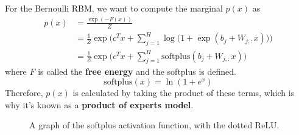     \begin{lemma} 
      For the Bernoulli RBM, we want to compute the marginal $p(x)$ as
      \begin{align*} 
      p(x) & = \frac{\exp(-F(x))}{Z} \\
                    & = \frac{1}{Z} \exp \bigg( c^T x + \sum_{j=1}^H \log \big( 1 + \exp (b_j + W_{j, :} x) \big) \bigg) \\
                    & = \frac{1}{Z} \exp \bigg( c^T x + \sum_{j=1}^H \mathrm{softplus}(b_j + W_{j, :} x ) \bigg)
      \end{align*}
      where $F$ is called the \textbf{free energy} and the softplus is defined. 
      \begin{equation}
        \text{softplus}(x) = \ln(1 + e^x)
      \end{equation}
      Therefore, $p(x)$ is calculated by taking the product of these terms, which is why it's known as a \textbf{product of experts model}. 

      \begin{figure}[H]
        \centering 
        \caption{A graph of the softplus activation function, with the dotted ReLU.} 
        \label{fig:softplus}
      \end{figure}
    \end{lemma}
